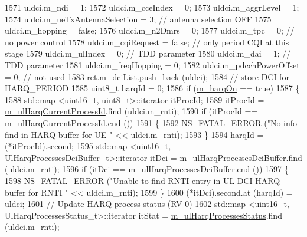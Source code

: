 \begin{DoxyCode}
1571       uldci.m\_ndi = 1;
1572       uldci.m\_cceIndex = 0;
1573       uldci.m\_aggrLevel = 1;
1574       uldci.m\_ueTxAntennaSelection = 3; \textcolor{comment}{// antenna selection OFF}
1575       uldci.m\_hopping = \textcolor{keyword}{false};
1576       uldci.m\_n2Dmrs = 0;
1577       uldci.m\_tpc = 0; \textcolor{comment}{// no power control}
1578       uldci.m\_cqiRequest = \textcolor{keyword}{false}; \textcolor{comment}{// only period CQI at this stage}
1579       uldci.m\_ulIndex = 0; \textcolor{comment}{// TDD parameter}
1580       uldci.m\_dai = 1; \textcolor{comment}{// TDD parameter}
1581       uldci.m\_freqHopping = 0;
1582       uldci.m\_pdcchPowerOffset = 0; \textcolor{comment}{// not used}
1583       ret.m\_dciList.push\_back (uldci);
1584       \textcolor{comment}{// store DCI for HARQ\_PERIOD}
1585       uint8\_t harqId = 0;
1586       \textcolor{keywordflow}{if} (\hyperlink{classns3_1_1RrFfMacScheduler_aa57694b4b80d2dc907f1e5281d3defab}{m\_harqOn} == \textcolor{keyword}{true})
1587         \{
1588           std::map <uint16\_t, uint8\_t>::iterator itProcId;
1589           itProcId = \hyperlink{classns3_1_1RrFfMacScheduler_ad7674f8cb560202bc36a792f7b2755ca}{m\_ulHarqCurrentProcessId}.find (uldci.m\_rnti);
1590           \textcolor{keywordflow}{if} (itProcId == \hyperlink{classns3_1_1RrFfMacScheduler_ad7674f8cb560202bc36a792f7b2755ca}{m\_ulHarqCurrentProcessId}.end ())
1591             \{
1592               \hyperlink{group__fatal_ga5131d5e3f75d7d4cbfd706ac456fdc85}{NS\_FATAL\_ERROR} (\textcolor{stringliteral}{"No info find in HARQ buffer for UE "} << uldci.m\_rnti);
1593             \}
1594           harqId = (*itProcId).second;
1595           std::map <uint16\_t, UlHarqProcessesDciBuffer\_t>::iterator itDci = 
      \hyperlink{classns3_1_1RrFfMacScheduler_a530849c4c8d3d5b0796e6af3d8d95173}{m\_ulHarqProcessesDciBuffer}.find (uldci.m\_rnti);
1596           \textcolor{keywordflow}{if} (itDci == \hyperlink{classns3_1_1RrFfMacScheduler_a530849c4c8d3d5b0796e6af3d8d95173}{m\_ulHarqProcessesDciBuffer}.end ())
1597             \{
1598               \hyperlink{group__fatal_ga5131d5e3f75d7d4cbfd706ac456fdc85}{NS\_FATAL\_ERROR} (\textcolor{stringliteral}{"Unable to find RNTI entry in UL DCI HARQ buffer for RNTI "} << 
      uldci.m\_rnti);
1599             \}
1600           (*itDci).second.at (harqId) = uldci;
1601           \textcolor{comment}{// Update HARQ process status (RV 0)}
1602           std::map <uint16\_t, UlHarqProcessesStatus\_t>::iterator itStat = 
      \hyperlink{classns3_1_1RrFfMacScheduler_a13fbe24878639869771e77ff813373ff}{m\_ulHarqProcessesStatus}.find (uldci.m\_rnti);

\end{DoxyCode}

